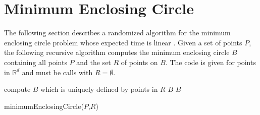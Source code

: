 \documentclass[a4paper, 11pt]{article}
\begin{document}
\appendix
\section{Minimum Enclosing Circle}

The following section describes a randomized algorithm for the minimum
enclosing circle problem whose expected time is linear
\cite{Welzl1991}.  Given a set of points $P$, the following recursive
algorithm computes the minimum enclosing circle $B$ containing all
points $P$ and the set $R$ of points on $B$. The code is given for
points in $\mathbb{R}^d$ and must be calls with $R=\emptyset$.


\begin{algorithm}[Hhtbp]
      {compute $B$ which is uniquely
        defined by  points in $R$\;
        \Return $B$\;
      }
  \Return $B$
  
  \caption{minimumEnclosingCircle($P$,$R$)}
  \label{algo:main}
\end{algorithm}






\end{document}
